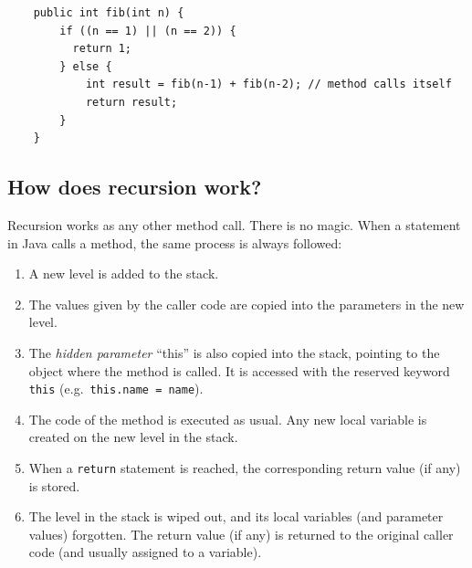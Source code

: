 \begin{verbatim}
    public int fib(int n) {
        if ((n == 1) || (n == 2)) {
          return 1; 
        } else {
            int result = fib(n-1) + fib(n-2); // method calls itself
            return result;
        }
    }
\end{verbatim}

\subsection{How does recursion work?}
\label{sec:how-does-recursion}


Recursion works as any other method call. There is no magic. When a
statement in Java calls a method, the same process is always 
followed: 

\begin{enumerate}
\item A new level is added to the stack.
\item The values given by the caller code are copied into the
  parameters in the new level.
\item The \emph{hidden parameter} ``this'' is also copied into the stack,
  pointing to the object where the method is called. It is accessed
  with the reserved keyword \verb+this+ (e.g.~\verb+this.name = name+).
\item The code of the method is executed as usual. Any new local
  variable is created on the new level in the stack. 
\item When a \verb+return+ statement is reached, the corresponding
  return value (if any) is stored.
\item The level in the stack is wiped out, and its local variables
  (and parameter values) forgotten. The return value (if any) is
  returned to the original caller code (and usually assigned to a
  variable).
\end{enumerate}

